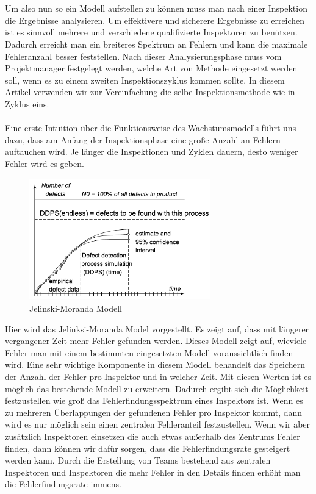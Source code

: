 \documentclass{llncs}
\begin{document}
\\ \\
Um also nun so ein Modell aufstellen zu können muss man nach einer Inspektion die Ergebnisse analysieren. Um effektivere und sicherere Ergebnisse zu erreichen ist es sinnvoll mehrere und verschiedene qualifizierte Inspektoren zu benützen. Dadurch erreicht man ein breiteres Spektrum an Fehlern und kann die maximale Fehleranzahl besser feststellen. Nach dieser Analysierungsphase muss vom Projektmanager festgelegt werden, welche Art von Methode eingesetzt werden soll, wenn es zu einem zweiten Inspektionszyklus kommen sollte. In diesem Artikel verwenden wir zur Vereinfachung die selbe Inspektionsmethode wie in Zyklus eins.
\\ \\
Eine erste Intuition über die Funktionsweise des Wachstumsmodells führt uns dazu, dass am Anfang der Inspektionsphase eine große Anzahl an Fehlern auftauchen wird. Je länger die Inspektionen und Zyklen dauern, desto weniger Fehler wird es geben.

\begin{figure}
	\centering
	\includegraphics[width=0.7\textwidth]{images/3_2_1.png}
	\caption{Jelinski-Moranda Modell}
	\label{fig:3_2_1_png}
\end{figure}

Hier wird das Jelinksi-Moranda Model vorgestellt. Es zeigt auf, dass mit längerer vergangener Zeit mehr Fehler gefunden werden. Dieses Modell zeigt auf, wieviele Fehler man mit einem bestimmten eingesetzten Modell voraussichtlich finden wird. Eine sehr wichtige Komponente in diesem Modell behandelt das Speichern der Anzahl der Fehler pro Inspektor und in welcher Zeit. Mit diesen Werten ist es möglich das bestehende Modell zu erweitern. Dadurch ergibt sich die Möglichkeit festzustellen wie groß das Fehlerfindungsspektrum eines Inspektors ist. Wenn es zu mehreren Überlappungen der gefundenen Fehler pro Inspektor kommt, dann wird es nur möglich sein einen zentralen Fehleranteil festzustellen. Wenn wir aber zusätzlich Inspektoren einsetzen die auch etwas außerhalb des Zentrums Fehler finden, dann können wir dafür sorgen, dass die Fehlerfindungsrate gesteigert werden kann. Durch die Erstellung von Teams bestehend aus zentralen Inspektoren und Inspektoren die mehr Fehler in den Details finden erhöht man die Fehlerfindungsrate immens.
\end{document}
